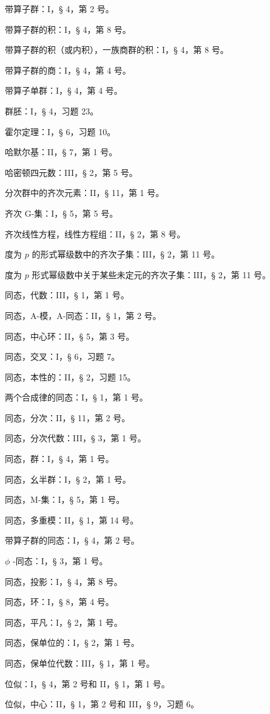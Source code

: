 带算子群：I，§ 4，第 2 号。

带算子群的积：I，§ 4，第 8 号。

带算子群的积（或内积），一族商群的积：I，§ 4，第 8 号。

带算子群的商：I，§ 4，第 4 号。

带算子单群：I，§ 4，第 4 号。

群胚：I，§ 4，习题 23。

霍尔定理：I，§ 6，习题 10。

哈默尔基：II，§ 7，第 1 号。

哈密顿四元数：III，§ 2，第 5 号。

分次群中的齐次元素：II，§ 11，第 1 号。

齐次 G-集：I，§ 5，第 5 号。

齐次线性方程，线性方程组：II，§ 2，第 8 号。

度为 \(p\) 的形式幂级数中的齐次子集：III，§ 2，第 11 号。

度为 \(p\) 形式幂级数中关于某些未定元的齐次子集：III，§ 2，第 11 号。

同态，代数：III，§ 1，第 1 号。

同态，A-模，A-同态：II，§ 1，第 2 号。

同态，中心环：II，§ 5，第 3 号。

同态，交叉：I，§ 6，习题 7。

同态，本性的：II，§ 2，习题 15。

两个合成律的同态：I，§ 1，第 1 号。

同态，分次：II，§ 11，第 2 号。

同态，分次代数：III，§ 3，第 1 号。

同态，群：I，§ 4，第 1 号。

同态，幺半群：I，§ 2，第 1 号。

同态，M-集：I，§ 5，第 1 号。

同态，多重模：II，§ 1，第 14 号。

带算子群的同态：I，§ 4，第 2 号。

\(\phi\) -同态：I，§ 3，第 1 号。

同态，投影：I，§ 4，第 8 号。

同态，环：I，§ 8，第 4 号。

同态，平凡：I，§ 2，第 1 号。

同态，保单位的：I，§ 2，第 1 号。

同态，保单位代数：III，§ 1，第 1 号。

位似：I，§ 4，第 2 号和 II，§ 1，第 1 号。

位似，中心：II，§ 1，第 2 号和 III，§ 9，习题 6。

